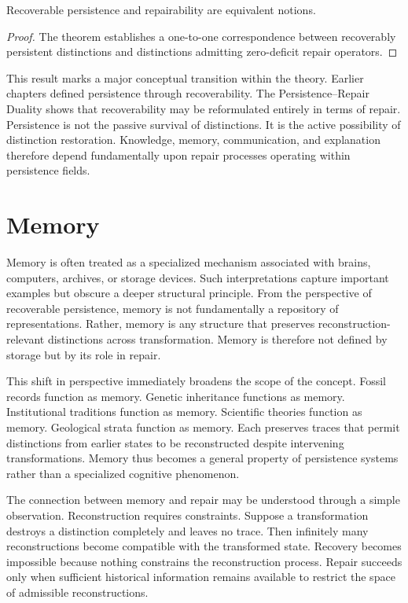 \documentclass[12pt,oneside]{article}
\theoremstyle{definition}
\begin{document}
\begin{corollary}

Recoverable persistence and repairability are equivalent notions.

\end{corollary}

\begin{proof}

The theorem establishes a one-to-one correspondence between recoverably persistent distinctions and distinctions admitting zero-deficit repair operators.

\end{proof}

This result marks a major conceptual transition within the theory. Earlier chapters defined persistence through recoverability. The Persistence–Repair Duality shows that recoverability may be reformulated entirely in terms of repair. Persistence is not the passive survival of distinctions. It is the active possibility of distinction restoration. Knowledge, memory, communication, and explanation therefore depend fundamentally upon repair processes operating within persistence fields.

\section{Memory}

Memory is often treated as a specialized mechanism associated with brains, computers, archives, or storage devices. Such interpretations capture important examples but obscure a deeper structural principle. From the perspective of recoverable persistence, memory is not fundamentally a repository of representations. Rather, memory is any structure that preserves reconstruction-relevant distinctions across transformation. Memory is therefore not defined by storage but by its role in repair.

This shift in perspective immediately broadens the scope of the concept. Fossil records function as memory. Genetic inheritance functions as memory. Institutional traditions function as memory. Scientific theories function as memory. Geological strata function as memory. Each preserves traces that permit distinctions from earlier states to be reconstructed despite intervening transformations. Memory thus becomes a general property of persistence systems rather than a specialized cognitive phenomenon.

The connection between memory and repair may be understood through a simple observation. Reconstruction requires constraints. Suppose a transformation destroys a distinction completely and leaves no trace. Then infinitely many reconstructions become compatible with the transformed state. Recovery becomes impossible because nothing constrains the reconstruction process. Repair succeeds only when sufficient historical information remains available to restrict the space of admissible reconstructions.
\end{document}
